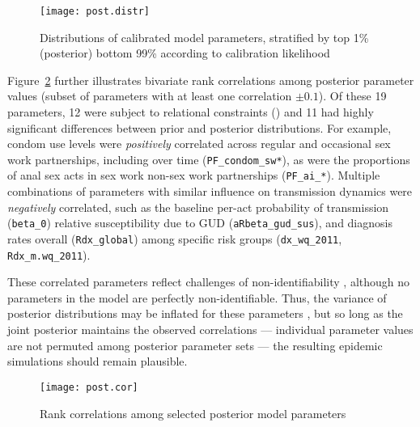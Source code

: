 \begin{figure}
  \centering\texttt{[image: post.distr]}
  \caption{Distributions of calibrated model parameters,
    stratified by top 1\% (posterior) \vs bottom 99\% according to calibration likelihood}
  \label{fig:post.distr}
\end{figure}
\par
Figure~\ref{fig:post.cor} further illustrates bivariate rank correlations among
posterior parameter values (subset of parameters with at least one correlation $\pm 0.1$).
Of these 19 parameters, 12 were subject to relational constraints ()
and 11 had highly significant differences between prior and posterior distributions.
For example, condom use levels were \emph{positively} correlated across
regular and occasional sex work partnerships, including over time (\texttt{PF_condom_sw*}), as were
the proportions of anal sex acts in sex work \vs non-sex work partnerships (\texttt{PF_ai_*}).
Multiple combinations of parameters with similar influence on transmission dynamics
were \emph{negatively} correlated, such as
the baseline per-act probability of transmission (\texttt{beta_0}) \vs
relative susceptibility due to GUD (\texttt{aRbeta_gud_sus}), and
diagnosis rates overall (\texttt{Rdx_global}) \vs
among specific risk groups (\texttt{dx_wq_2011}, \texttt{Rdx_m.wq_2011}).
\par
These correlated parameters reflect challenges of non-identifiability \cite{Raue2009},
although no parameters in the model are perfectly non-identifiable.
Thus, the variance of posterior distributions may be inflated for these parameters \cite{Raue2009},
but so long as the joint posterior maintains the observed correlations
--- \ie individual parameter values are not permuted among posterior parameter sets ---
the resulting epidemic simulations should remain plausible.
\begin{figure}
  \centering\texttt{[image: post.cor]}
  \caption{Rank correlations among selected posterior model parameters}
  \label{fig:post.cor}
\end{figure}
